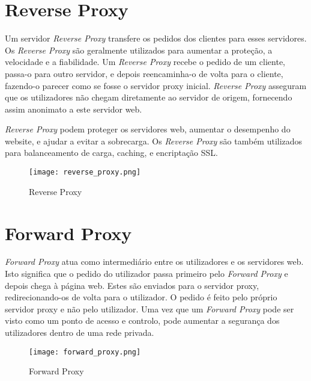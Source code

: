 \section{Reverse Proxy}

Um servidor \textit{Reverse Proxy} transfere os pedidos dos clientes para esses servidores. Os \textit{Reverse Proxy} são geralmente utilizados para aumentar a proteção, a velocidade e a fiabilidade. Um \textit{Reverse Proxy} recebe o pedido de um cliente, passa-o para outro servidor, e depois reencaminha-o de volta para o cliente, fazendo-o parecer como se fosse o servidor proxy inicial. \textit{Reverse Proxy} asseguram que os utilizadores não chegam diretamente ao servidor de origem, fornecendo assim anonimato a este servidor web.

\textit{Reverse Proxy} podem proteger os servidores web, aumentar o desempenho do website, e ajudar a evitar a sobrecarga. Os \textit{Reverse Proxy} são também utilizados para balanceamento de carga, caching, e encriptação \ac{SSL}.

\begin{figure}[H]
\center
\texttt{[image: reverse\_proxy.png]}
\caption{Reverse Proxy}
\end{figure}

\section{Forward Proxy}

\textit{Forward Proxy} atua como intermediário entre os utilizadores e os servidores web. Isto significa que o pedido do utilizador passa primeiro pelo \textit{Forward Proxy} e depois chega à página web. Estes são enviados para o servidor proxy, redirecionando-os de volta para o utilizador. O pedido é feito pelo próprio servidor proxy e não pelo utilizador.
Uma vez que um \textit{Forward Proxy} pode ser visto como um ponto de acesso e controlo, pode aumentar a segurança dos utilizadores dentro de uma rede privada.

\begin{figure}[H]
\center
\texttt{[image: forward\_proxy.png]}
\caption{Forward Proxy}
\end{figure}